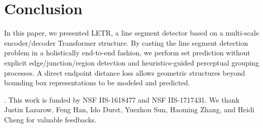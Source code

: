 \documentclass[final]{cvpr}
\begin{document}
\section{Conclusion}
\vspace{-2mm}
In this paper, we presented LETR, a line segment detector based on a multi-scale encoder/decoder Transformer structure. By casting the line segment detection problem in a holistically end-to-end fashion, we perform set prediction without explicit edge/junction/region detection and heuristics-guided perceptual grouping processes. A direct endpoint distance loss allows geometric structures beyond bounding box representations to be modeled and predicted.

\vspace{1mm}
. \small{This work is funded by NSF IIS-1618477 and NSF IIS-1717431. We thank Justin Lazarow, Feng Han, Ido Durst, Yuezhou Sun, Haoming Zhang, and Heidi Cheng for valuable feedbacks.}

{\small


}
\end{document}
